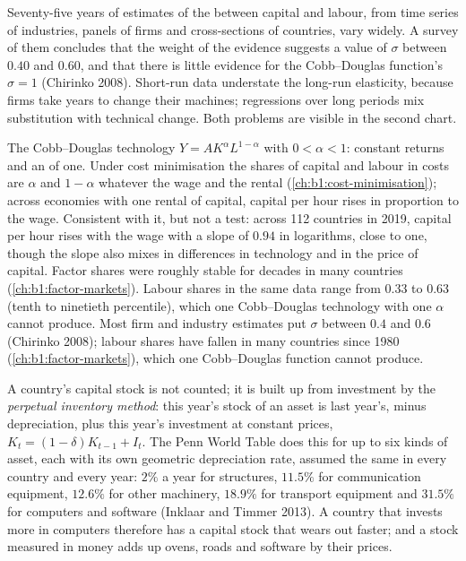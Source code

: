 \begin{record}
Seventy-five years of estimates of the  between
capital and labour, from time series of industries, panels of firms and
cross-sections of countries, vary widely. A survey of them concludes that
the weight of the evidence suggests a value of $\sigma$ between $0.40$ and
$0.60$, and that there is little evidence for the Cobb--Douglas function's
$\sigma = 1$ (Chirinko 2008). %
Short-run data understate the long-run elasticity, because firms take
years to change their machines; regressions over long periods mix
substitution with technical change. Both problems are visible in the
second chart.
\end{record}

\begin{model}{The Cobb--Douglas technology}
\assumes $Y = AK^\alpha L^{1-\alpha}$ with $0 < \alpha < 1$: constant returns and an  of one.
\predicts Under cost minimisation the shares of capital and labour in costs
are $\alpha$ and $1 - \alpha$ whatever the wage and the rental (\cref{ch:b1:cost-minimisation});
across economies with one rental of capital, capital per hour rises in
proportion to the wage.
\tested Consistent with it, but not a test: across 112 countries in 2019,
capital per hour rises with the wage with a slope of $0.94$ in logarithms,
close to one, though the slope also mixes in differences in technology and
in the price of capital. %
Factor shares were roughly stable for decades in many countries
(\cref{ch:b1:factor-markets}).
\breaks Labour shares in the same data range from 0.33 to 0.63 (tenth to
ninetieth percentile), %
which one Cobb--Douglas technology with one $\alpha$ cannot produce. Most firm and industry estimates put $\sigma$ between $0.4$ and $0.6$
(Chirinko 2008); %
labour shares have fallen in many countries since 1980
(\cref{ch:b1:factor-markets}), which one Cobb--Douglas function cannot
produce.
\end{model}

\begin{measure}
A country's capital stock is not counted; it is built up from investment by
the \emph{perpetual inventory method}: this year's stock of an asset is
last year's, minus depreciation, plus this year's investment at constant
prices, $K_t = (1 - \delta)K_{t-1} + I_t$. The Penn World Table does this for up
to six kinds of asset, each with its own geometric depreciation rate,
assumed the same in every country and every year: $2\%$ a year for
structures, $11.5\%$ for communication equipment, $12.6\%$ for other
machinery, $18.9\%$ for transport equipment and $31.5\%$ for computers and
software (Inklaar and Timmer 2013). %
A country that invests more in computers therefore has a capital stock
that wears out faster; and a stock measured in money adds up ovens,
roads and software by their prices.
\end{measure}

